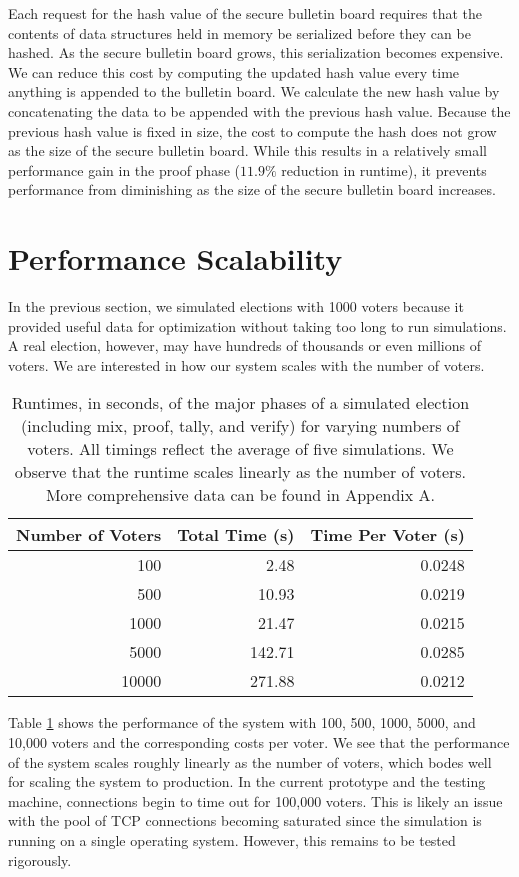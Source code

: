 Each request for the hash value of the secure bulletin board requires that the contents of data structures held in memory be serialized before they can be hashed. As the secure bulletin board grows, this serialization becomes expensive. We can reduce this cost by computing the updated hash value every time anything is appended to the bulletin board. We calculate the new hash value by concatenating the data to be appended with the previous hash value. Because the previous hash value is fixed in size, the cost to compute the hash does not grow as the size of the secure bulletin board. While this results in a relatively small performance gain in the proof phase ($11.9\%$ reduction in runtime), it prevents performance from diminishing as the size of the secure bulletin board increases.

\section{Performance Scalability} \label{perf:scale}

In the previous section, we simulated elections with 1000 voters because it provided useful data for optimization without taking too long to run simulations. A real election, however, may have hundreds of thousands or even millions of voters. We are interested in how our system scales with the number of voters.

\begin{table}[htbp]
\centering
\begin{tabular}{r | r | r}
  \textbf{Number of Voters} & \textbf{Total Time (s)} & \textbf{Time Per Voter (s)} \\
  \hline
  100 & 2.48 & 0.0248 \\
  500 & 10.93 & 0.0219 \\
  1000 & 21.47 & 0.0215 \\
  5000 & 142.71 & 0.0285 \\
  10000 & 271.88 & 0.0212
\end{tabular}
\caption[Election runtime for varying numbers of voters]{Runtimes, in seconds, of the major phases of a simulated election (including mix, proof, tally, and verify) for varying numbers of voters. All timings reflect the average of five simulations. We observe that the runtime scales linearly as the number of voters. More comprehensive data can be found in Appendix A.}
\label{perf:nvoters}
\end{table}

Table \ref{perf:nvoters} shows the performance of the system with 100, 500, 1000, 5000, and 10,000 voters and the corresponding costs per voter. We see that the performance of the system scales roughly linearly as the number of voters, which bodes well for scaling the system to production. In the current prototype and the testing machine, connections begin to time out for 100,000 voters. This is likely an issue with the pool of TCP connections becoming saturated since the simulation is running on a single operating system. However, this remains to be tested rigorously.

